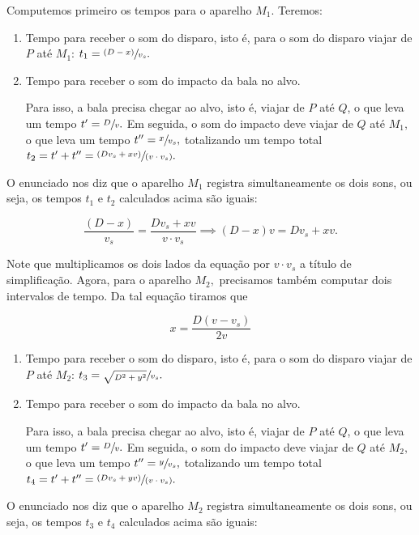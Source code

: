 \begin{exemplo}
Computemos primeiro os tempos para o aparelho $M_1$. Teremos:

\begin{enumerate}
    \item [(i)] Tempo para receber o som do disparo, isto é, para o som do disparo viajar de $P$ até $M_1$: $t_1 = \sfrac{(D-x)}{v_s}.$

    \item [(ii)] Tempo para receber o som do impacto da bala no alvo.

    Para isso, a bala precisa chegar ao alvo, isto é, viajar de $P$ até $Q$, o que leva um tempo $t'=\sfrac{D}{v}.$ Em seguida, o som do impacto deve viajar de $Q$ até $M_1,$ o que leva um tempo $t''=\sfrac{x}{v_s},$ totalizando um tempo total $t_2=t'+t''= \sfrac{(Dv_s+xv)}{(v \cdot v_s)}.$
\end{enumerate}

O enunciado nos diz que o aparelho $M_1$ registra simultaneamente os dois sons, ou seja, os tempos $t_1$ e $t_2$ calculados acima são iguais:

$$ \dfrac{(D-x)}{v_s} = \dfrac{Dv_s+xv}{v\cdot v_s}  \implies \boxed{(D-x) v = Dv_s+xv.}$$

Note que multiplicamos os dois lados da equação por $v \cdot v_s$ a título de simplificação. Agora, para o aparelho $M_2,$ precisamos também computar dois intervalos de tempo. Da tal equação tiramos que 

\begin{equation}
 \boxed{x=\dfrac{D(v-v_s)}{2v}}    
 \label{eq_cinematica_mu_questaoITA01}
\end{equation}


\begin{enumerate}
    \item [(i)] Tempo para receber o som do disparo, isto é, para o som do disparo viajar de $P$ até $M_2$: $t_3 = \sfrac{\sqrt{D^2+y^2}}{v_s}.$

    \item [(ii)] Tempo para receber o som do impacto da bala no alvo.

    Para isso, a bala precisa chegar ao alvo, isto é, viajar de $P$ até $Q$, o que leva um tempo $t'=\sfrac{D}{v}.$ Em seguida, o som do impacto deve viajar de $Q$ até $M_2,$ o que leva um tempo $t''=\sfrac{y}{v_s},$ totalizando um tempo total $t_4=t'+t''= \sfrac{(Dv_s+yv)}{(v \cdot v_s)}.$
\end{enumerate}

O enunciado nos diz que o aparelho $M_2$ registra simultaneamente os dois sons, ou seja, os tempos $t_3$ e $t_4$ calculados acima são iguais:


\end{exemplo}
